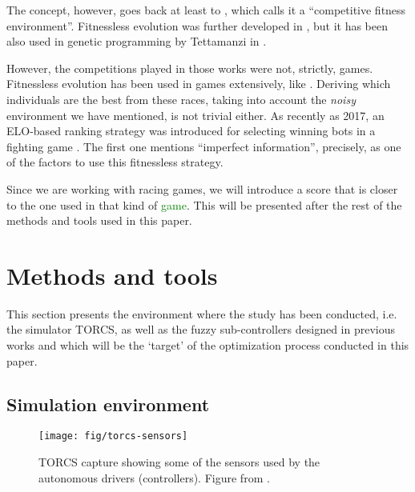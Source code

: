 \documentclass[10pt,journal,compsoc]{IEEEtran}
\begin{document}
The concept, however, goes back at least to
\cite{Angeline:1993:CEE:645513.657590}, which calls it a ``competitive
fitness environment''. Fitnessless evolution was further developed in
\cite{rosin1995methods}, but it has been also used in genetic
programming by Tettamanzi in \cite{tettamanzi1996genetic}.

However, the competitions played in those works were not, strictly,
games. Fitnessless evolution has been used in games extensively, like
\cite{Jaskowski2008,10.1007/978-3-540-78671-9_2,fernandez2016_only_one}.
Deriving which individuals are the best from these races, taking into account
the {\em noisy} environment we have mentioned, is not trivial
either. As recently as 2017, an ELO-based ranking strategy was
introduced for selecting winning bots in a fighting game
\cite{7792145}. The first one mentions ``imperfect information'',
precisely, as one of the factors to use this fitnessless strategy.

Since we are working with racing games, we will introduce a score that
is closer to the one used in that kind of \textcolor{green}{game}. This will be
presented after the rest of the methods and tools used in this paper. 



\section{Methods and tools}
\label{sec:methods}

This section presents the environment where the study has been conducted, i.e. the simulator TORCS, as well as the fuzzy sub-controllers designed in previous works and which will be the `target' of the optimization process conducted in this paper. 

%

\subsection{Simulation environment}

\begin{figure}[!ht] 
	\begin{center}
		\texttt{[image: fig/torcs-sensors]}
		\caption {TORCS capture showing some of the sensors
                used by the autonomous drivers (controllers). Figure from \cite{DBLP:conf/cig/SalemMG19}.}
		\label{fig:torcs-sensors}
	\end{center}
\end{figure}
\end{document}
